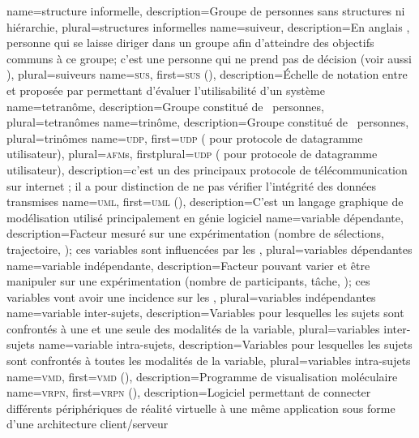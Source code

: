 %
{%
	name={structure informelle},%
	description={Groupe de personnes sans structures ni hiérarchie},%
	plural={structures informelles}%
}
%
{%
	name={suiveur},%
	description={En anglais , personne qui se laisse diriger dans un groupe afin d'atteindre des objectifs communs à ce groupe; c'est une personne qui ne prend pas de décision (voir aussi )},%
	plural={suiveurs}%
}
%
{%
	name={\textsc{sus}},%
	first={\textsc{sus} ()},%
	description={Échelle de notation entre  et  proposée par  permettant d'évaluer l'utilisabilité d'un système}%
}
%
{%
	name={tetranôme},%
	description={Groupe constitué de ~personnes},%
	plural={tetranômes}%
}
%
{%
	name={trinôme},%
	description={Groupe constitué de ~personnes},%
	plural={trinômes}%
}
%
{%
	name={\textsc{udp}},
	first={\textsc{udp} ( pour protocole de datagramme utilisateur)},%
	plural={\textsc{afm}s},%
	firstplural={\textsc{udp} ( pour protocole de datagramme utilisateur)},%
	description={c'est un des principaux protocole de télécommunication sur internet ; il a pour distinction de ne pas vérifier l'intégrité des données transmises}
}
%
{%
	name={\textsc{uml}},%
	first={\textsc{uml} ()},%
	description={C'est un langage graphique de modélisation utilisé principalement en génie logiciel}%
}
%
{%
	name={variable dépendante},%
	description={Facteur mesuré sur une expérimentation (nombre de sélections, trajectoire, \myetc); ces variables sont influencées par les },%
	plural={variables dépendantes}%
}
%
{%
	name={variable indépendante},%
	description={Facteur pouvant varier et être manipuler sur une expérimentation (nombre de participants, tâche, \myetc); ces variables vont avoir une incidence sur les },%
	plural={variables indépendantes}%
}
%
{%
	name={variable inter-sujets},%
	description={Variables pour lesquelles les sujets sont confrontés à une et une seule des modalités de la variable},%
	plural={variables inter-sujets}%
}
%
{%
	name={variable intra-sujets},%
	description={Variables pour lesquelles les sujets sont confrontés à toutes les modalités de la variable},%
	plural={variables intra-sujets}%
}
%
{%
	name={\textsc{vmd}},%
	first={\textsc{vmd} ()},%
	description={Programme de visualisation moléculaire }%
}
%
{%
	name={\textsc{vrpn}},%
	first={\textsc{vrpn} ()},%
	description={Logiciel permettant de connecter différents périphériques de réalité virtuelle à une même application sous forme d'une architecture client/serveur }%
}
